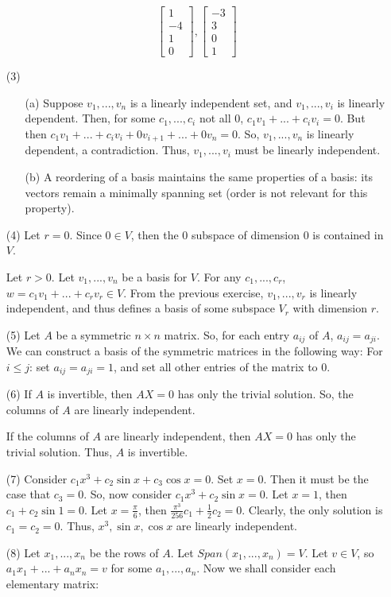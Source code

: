 \begin{itemize}
$$\begin{bmatrix}
1 \\
-4 \\
1 \\
0
\end{bmatrix}, \begin{bmatrix}
-3 \\
3 \\
0 \\
1
\end{bmatrix}$$
\item[(3)]
\begin{itemize}
\item[(a)]
Suppose $v_1, ..., v_n$ is a linearly independent set, and $v_1, ..., v_i$ is linearly dependent. Then, for some $c_1, ..., c_i$ not all 0, $c_1v_1 + ... + c_iv_i = 0$. But then $c_1v_1 + ... + c_iv_i + 0v_{i+1} + ... + 0v_n = 0$. So, $v_1, ..., v_n$ is linearly dependent, a contradiction. Thus, $v_1, ..., v_i$ must be linearly independent.
\item[(b)]
A reordering of a basis maintains the same properties of a basis: its vectors remain a minimally spanning set (order is not relevant for this property).
\end{itemize}
\item[(4)]
Let $r = 0$. Since $0 \in V$, then the 0 subspace of dimension 0 is contained in $V$.

Let $r > 0$. Let $v_1, ..., v_n$ be a basis for $V$. For any $c_1, ..., c_r$, $w = c_1v_1 + ... + c_rv_r \in V$. From the previous exercise, $v_1, ..., v_r$ is linearly independent, and thus defines a basis of some subspace $V_r$ with dimension $r$.
\item[(5)]
Let $A$ be a symmetric $n \times n$ matrix. So, for each entry $a_{ij}$ of $A$, $a_{ij} = a_{ji}$. We can construct a basis of the symmetric matrices in the following way: For $i \leq j$: set $a_{ij} = a_{ji} = 1$, and set all other entries of the matrix to 0.
\item[(6)]
If $A$ is invertible, then $AX = 0$ has only the trivial solution. So, the columns of $A$ are linearly independent.

If the columns of $A$ are linearly independent, then $AX = 0$ has only the trivial solution. Thus, $A$ is invertible.
\item[(7)]
Consider $c_1x^3 + c_2\sin x + c_3\cos x = 0$. Set $x = 0$. Then it must be the case that $c_3 = 0$. So, now consider $c_1x^3 + c_2\sin x = 0$. Let $x = 1$, then $c_1 + c_2\sin 1 = 0$. Let $x = \frac{\pi}{6}$, then $\frac{\pi^3}{256}c_1 + \frac{1}{2}c_2 = 0$. Clearly, the only solution is $c_1 = c_2 = 0$. Thus, $x^3, \sin x, \cos x$ are linearly independent.
\item[(8)]
Let $x_1, ..., x_n$ be the rows of $A$. Let $Span(x_1, ..., x_n) = V$. Let $v \in V$, so $a_1x_1 + ... + a_nx_n = v$ for some $a_1, ..., a_n$. Now we shall consider each elementary matrix:


\end{itemize}
